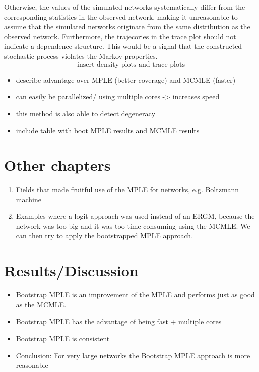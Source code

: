 \documentclass[headsepline=true, abstracton]{scrartcl}
\begin{document}
Otherwise, the values of the simulated networks systematically differ from the corresponding statistics in the observed network, making it unreasonable to assume that the simulated networks originate from the same distribution as the observed network. Furthermore, the trajecories in the trace plot should not indicate a dependence structure. This would be a signal that the constructed stochastic process violates the Markov properties.
$$\text{insert density plots and trace plots}$$

\begin{itemize}

\item describe advantage over MPLE (better coverage) and MCMLE (faster)
\item can easily be parallelized/ using multiple cores -> increases speed
\item this method is also able to detect degeneracy
\item include table with boot MPLE results and MCMLE results
\end{itemize}


 \section*{Other chapters}
 
 \begin{enumerate}
 \item Fields that made fruitful use of the MPLE for networks, e.g. Boltzmann machine
 \item Examples where a logit approach was used instead of an ERGM, because the network was too big and it was too time consuming using the MCMLE. We can then try to apply the bootstrapped MPLE approach.
\end{enumerate}   
   


 \section*{Results/Discussion}
\begin{itemize}
  
 \item  Bootstrap MPLE is an improvement of the MPLE and performs just as good as the MCMLE. \\
\item Bootstrap MPLE has the advantage of being fast + multiple cores\\ 
\item Bootstrap MPLE is consistent\\
\item Conclusion: For very large networks the Bootstrap MPLE approach is more reasonable
   
\end{itemize}

   
\newpage


 

\end{document}
